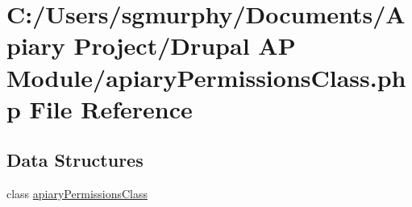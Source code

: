 \hypertarget{apiary_permissions_class_8php}{
\section{C:/Users/sgmurphy/Documents/Apiary Project/Drupal AP Module/apiaryPermissionsClass.php File Reference}
\label{apiary_permissions_class_8php}
}
\subsection*{Data Structures}
\begin{DoxyCompactItemize}
\item 
class \hyperlink{classapiary_permissions_class}{apiaryPermissionsClass}
\end{DoxyCompactItemize}
